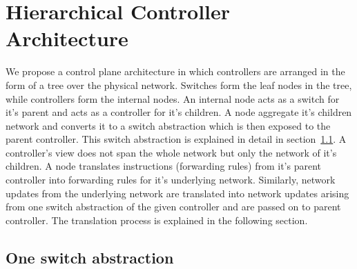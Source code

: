 \documentclass[10pt, twocolumn]{article}
\begin{document}
\section{Hierarchical Controller Architecture}
\label{sec:hierarchical}
We propose a control plane architecture in which controllers are arranged in the form of a tree over the physical network. Switches form the leaf nodes in the tree, while controllers form the internal nodes. An internal node acts as a switch for it's parent and acts as a controller for it's children. A node aggregate it's children network and converts it to a switch abstraction which is then exposed to the parent controller. This switch abstraction is explained in detail in section~\ref{subsec:aggr}. A controller's view does not span the whole network but only the network of it's children. A node translates instructions (forwarding rules) from it's parent controller into forwarding rules for it's underlying network. Similarly, network updates from the underlying network are translated into network updates arising from one switch abstraction of the given controller and are passed on to parent controller. The translation process is explained in the following section. 

\subsection{One switch abstraction}
\label{subsec:aggr}
      
\end{document}
